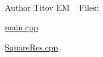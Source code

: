 ~\newline
\begin{DoxyAuthor}{Author}
Titov EM ~\newline
Files\+: ~\newline

\begin{DoxyItemize}
\item \hyperlink{main_8cpp}{main.\+cpp}
\item \hyperlink{_square_res_8cpp}{Square\+Res.\+cpp} 
\end{DoxyItemize}
\end{DoxyAuthor}

